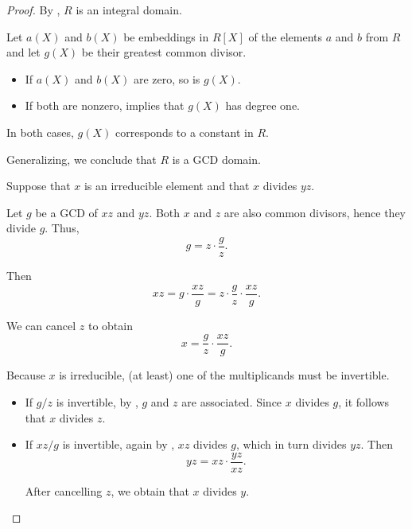 \begin{proof}
   By , \( R \) is an integral domain.

  Let \( a(X) \) and \( b(X) \) be embeddings in \( R[X] \) of the elements \( a \) and \( b \) from \( R \) and let \( g(X) \) be their greatest common divisor.

  \begin{itemize}
    \item If \( a(X) \) and \( b(X) \) are zero, so is \( g(X) \).
    \item If both are nonzero,  implies that \( g(X) \) has degree one.
  \end{itemize}

  In both cases, \( g(X) \) corresponds to a constant in \( R \).

  Generalizing, we conclude that \( R \) is a GCD domain.

   Suppose that \( x \) is an irreducible element and that \( x \) divides \( yz \).

  Let \( g \) be a GCD of \( xz \) and \( yz \). Both \( x \) and \( z \) are also common divisors, hence they divide \( g \). Thus,
  \begin{equation*}
    g = z \cdot \frac g z.
  \end{equation*}

  Then
  \begin{equation*}
    xz = g \cdot \frac {xz} g = z \cdot \frac g z \cdot \frac {xz} g.
  \end{equation*}

  We can cancel \( z \) to obtain
  \begin{equation*}
    x = \frac g z \cdot \frac {xz} g.
  \end{equation*}

  Because \( x \) is irreducible, (at least) one of the multiplicands must be invertible.
  \begin{itemize}
    \item If \( g / z \) is invertible, by , \( g \) and \( z \) are associated. Since \( x \) divides \( g \), it follows that \( x \) divides \( z \).

    \item If \( xz / g \) is invertible, again by , \( xz \) divides \( g \), which in turn divides \( yz \). Then
    \begin{equation*}
      yz = xz \cdot \frac {yz} {xz}.
    \end{equation*}

    After cancelling \( z \), we obtain that \( x \) divides \( y \).
  \end{itemize}
\end{proof}

